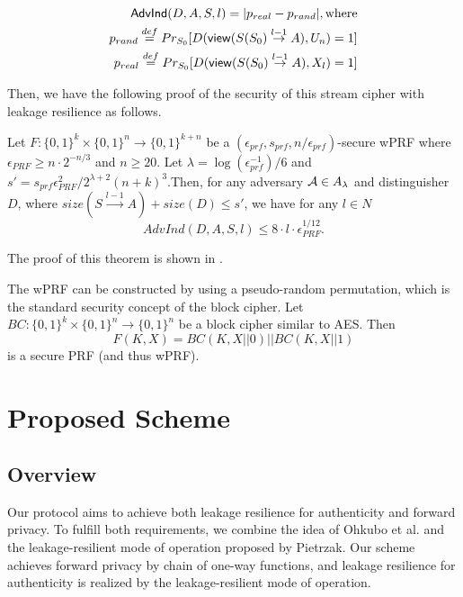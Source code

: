 \documentclass[english]{llncs}
\begin{document}
\begin{eqnarray*}
{\sf AdvInd}(D,A,S,l)=|p_{real}-p_{rand}|,{\rm where}\\
p_{rand}\stackrel{def}{=}Pr_{S_{0}}[D({\sf view}(S(S_{0})\stackrel{l-1}{\to}A),U_{n})=1]\\
p_{real}\stackrel{def}{=}Pr_{S_{0}}[D({\sf view}(S(S_{0})\stackrel{l-1}{\to}A),X_{l})=1]\end{eqnarray*}


Then, we have the following proof of the security of this stream cipher
with leakage resilience as follows. 
\begin{theorem}
Let $F:\{0,1\}^{k}\times\{0,1\}^{n}\to\{0,1\}^{k+n}$ be a $(\epsilon_{prf},s_{prf},n/\epsilon_{prf})$-secure
wPRF where $\epsilon_{PRF}\ge n\cdot2^{-n/3}$ and $n\ge20$. Let
$\lambda=\log(\epsilon_{prf}^{-1})/6$ and $s'=s_{prf}\epsilon_{PRF}^{2}/2^{\lambda+2}(n+k)^{3}$.Then,
for any adversary ${\cal A}\in A_{\lambda}$ and distinguisher $D$,
where $size(S\stackrel{l-1}{\to}A)+size(D)\le s'$, we have for any
$l\in N$ \[
AdvInd(D,A,S,l)\le8\cdot l\cdot\epsilon_{PRF}^{1/12}.\]
 
\end{theorem}
The proof of this theorem is shown in \cite{P09}.

The wPRF 
can be constructed by using
a pseudo-random permutation, which is the standard security concept
of the block cipher. Let $BC:\{0,1\}^{k}\times\{0,1\}^{n}\to\{0,1\}^{n}$
be a block cipher similar to AES. %
Then \[
F(K,X)=BC(K,X||0)||BC(K,X||1)\]
 is a secure PRF (and thus wPRF).

\section{Proposed Scheme}
\subsection{Overview}

Our protocol aims to achieve both leakage resilience for authenticity
and forward privacy. To fulfill both requirements, we combine the
idea of
Ohkubo et al.\cite{OSK03}
and the leakage-resilient mode of operation proposed by Pietrzak\cite{P09}.
Our scheme achieves forward privacy by chain of one-way functions,
and leakage resilience for authenticity is realized by the leakage-resilient
mode of operation.
\end{document}
